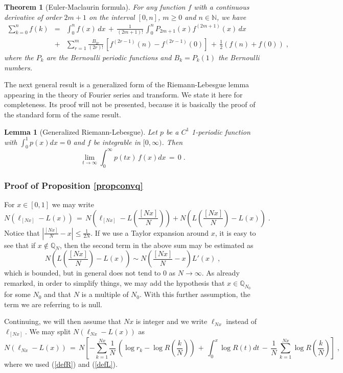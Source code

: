 \documentclass[12pt]{article}
\newtheorem{theorem}{Theorem}
\newtheorem{lemma}{Lemma}
\begin{document}
\begin{theorem}[Euler-Maclaurin formula]\label{EulerMactheo}
For any function $f$ with a continuous derivative of order $2m + 1$ on the interval $[0, n]$, $m \geq 0$ and $n \in \mathbb{N}$, we have
\begin{eqnarray}
\sum_{k=0}^n f(k) &=& \int_0^n f(x)\,dx \,+\, \frac{1}{(2m+1)!}\, \int_0^n P_{2m+1}(x) f^{(2m+1)}(x)\, dx \nonumber\\
&+& \sum_{r=1}^m \frac{B_{2r}}{(2r)!} \, \left[f^{(2r-1)}(n)- f^{(2r-1)}(0)\right] \,+\,\frac{1}{2}(f(n)+f(0))\;, \label{eulerformula}
\end{eqnarray}
where the $P_k$ are the Bernoulli periodic functions and $B_k=P_k(1)$ the Bernoulli numbers.
\end{theorem}

The next general result is a generalized form of the Riemann-Lebesgue lemma appearing in the theory of Fourier series and transform. We state it here for completeness. Its proof will not be presented, because it is basically the proof of the standard form of the same result.

\begin{lemma}[Generalized Riemann-Lebesgue] \label{riemannlebesgue}
Let $p$ be a $C^1$ 1-periodic function with $\int_0^1 p(x)dx=0$ and $f$ be integrable in $[0, \infty)$.
Then
\[\lim_{t \rightarrow \infty} \int_0^{\infty} p(t x) \,f(x) dx \,=\,0 \;.\]
\end{lemma}

\subsubsection{Proof of Proposition \ref{propconvq}}
\label{subpropconvq}
For $x \in [0,1]$ we may write
\[N (\ell_{[Nx]}-L(x)) \,=\, N(\ell_{[Nx]}-L(\frac{[Nx]}{N}))+ N( L(\frac{[Nx]}{N})-L(x))\;.\]
Notice that $|\frac{[Nx]}{N}-x| \leq\frac{1}{2N}$. If we use a Taylor expansion around $x$, it is easy to see that if $x \notin \mathbb{Q}_N$, then the second term in the above sum may be estimated as
\[N( L(\frac{[Nx]}{N})-L(x)) \sim N (\frac{[Nx]}{N}-x) L'(x)\;,\]
which is bounded, but in general does not tend to 0 as $N \rightarrow \infty$. As already remarked, in order to simplify things, we may add the hypothesis that $x\in \mathbb{Q}_{N_0}$ for some $N_0$ and that $N$ is a multiple of $N_0$. With this further assumption, the term we are referring to is null.

Continuing, we will then assume that $Nx$ is integer and we write $\ell_{Nx}$ instead of $\ell_{[Nx]}$. We may split $N (\ell_{Nx}-L(x))$ as
\[N (\ell_{Nx}-L(x)) \,=\, N\left[-\sum_{k=1}^{Nx}\frac{1}{N}\, (\log r_k-\log R(\frac{k}{N})) \,+\, \int_0^x \log R(t)dt \,-\, \frac{1}{N} \, \sum_{k=1}^{Nx} \log  R(\frac{k}{N}) \right] \;,\]
where we used (\ref{defR}) and (\ref{defL}).
\end{document}
